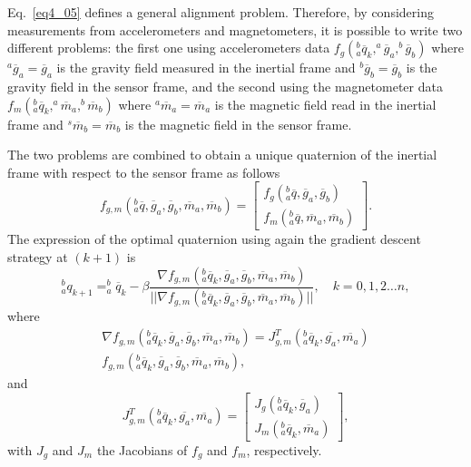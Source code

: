 Eq.~\eqref{eq4_05} defines a general alignment problem. Therefore, by considering measurements from accelerometers and magnetometers, it is possible to write two different problems: the first one using accelerometers data $f_g(^b_a \overline{q}_k, ^a \overline{g}_a, ^b \overline{g}_b)$ where $^a\overline{g}_a = \overline{g}_a$ is the gravity field measured in the inertial frame and $^b \overline{g}_b = \overline{g}_b$ is the gravity field in the sensor frame, and the second using the magnetometer data $f_m(^b_a \overline{q}_k, ^a \overline{m}_a, ^b \overline{m}_b)$ where $^a\overline{m}_a = \overline{m}_a$ is the magnetic field read in the inertial frame and $^s \overline{m}_b = \overline{m}_b$ is the magnetic field in the sensor frame. 

The two problems are combined to obtain a unique quaternion of the inertial frame with respect to the sensor frame as follows
\begin{equation}
\label{eq4_14}
f_{g,m}(^b_a \overline{q},\overline{g}_a,\overline{g}_b,\overline{m}_a,\overline{m}_b) = \left [ \begin{array}{c} f_g(^b_a \overline{q}, \overline{g}_a, \overline{g}_b) \\  f_m(^b_a \overline{q},  \overline{m}_a,  \overline{m}_b) \end{array} \right ].
\end{equation}
The expression of the optimal quaternion using again the gradient descent strategy at $(k+1)$ is
\begin{equation}
\label{eq4_15}
^b_a q_{k+1} = ^b_a \overline{q}_k - \beta \frac{\nabla f_{g,m}(^b_a \overline{q}_k,\overline{g}_a,\overline{g}_b,\overline{m}_a,\overline{m}_b) }{\vert \vert \nabla f_{g,m}(^b_a \overline{q}_k,\overline{g}_a,\overline{g}_b,\overline{m}_a,\overline{m}_b)  \vert \vert}, \quad k = 0,1,2 \dots n,
\end{equation}
where
\begin{equation}
\begin{split}
\label{eq4_16}
\nabla f_{g,m}(^b_a \overline{q}_k,\overline{g}_a,\overline{g}_b,\overline{m}_a,\overline{m}_b) = J_{g,m}^T(^b_a \overline{q}_k, \overline{g_a},\overline{m_a}) \\ {f}_{g,m}(^b_a \overline{q}_k,\overline{g}_a,\overline{g}_b,\overline{m}_a,\overline{m}_b),
\end{split}
\end{equation}
and
\begin{equation}
\label{eq4_17}
J_{g,m}^T(^b_a \overline{q}_k, \overline{g_a}, \overline{m_a}) = \left [ \begin{array}{c} J_g(^b_a \overline{q}_k,\overline{g}_a) \\ J_m(^b_a \overline{q}_k, \overline{m}_a) \end{array} \right ],
\end{equation}
with $J_g$ and $J_m$ the Jacobians of $f_g$ and $f_m$, respectively.

